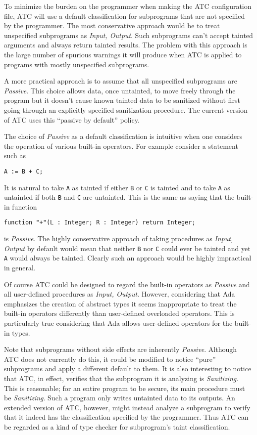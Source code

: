 \documentclass{article}
\begin{document}
To minimize the burden on the programmer when making the ATC configuration file, ATC will use a default classification for subprograms that are not specified by the programmer. The most conservative approach would be to treat unspecified subprograms as \textit{Input, Output}. Such subprograms can't accept tainted arguments and always return tainted results. The problem with this approach is the large number of spurious warnings it will produce when ATC is applied to programs with mostly unspecified subprograms.

A more practical approach is to assume that all unspecified subprograms are \textit{Passive}. This choice allows data, once untainted, to move freely through the program but it doesn't cause known tainted data to be sanitized without first going through an explicitly specified sanitization procedure. The current version of ATC uses this ``passive by default'' policy.

The choice of \textit{Passive} as a default classification is intuitive when one considers the operation of various built-in operators. For example consider a statement such as

\begin{verbatim}
A := B + C;
\end{verbatim}

It is natural to take \texttt{A} as tainted if either \texttt{B} or \texttt{C} is tainted and to take \texttt{A} as untainted if both \texttt{B} and \texttt{C} are untainted. This is the same as saying that the built-in function

\vspace{1.0ex}
\centerline{\texttt{function "+"(L : Integer; R : Integer) return Integer;}}

is \textit{Passive}. The highly conservative approach of taking procedures as \textit{Input, Output} by default would mean that neither \texttt{B} nor \texttt{C} could ever be tainted and yet \texttt{A} would always be tainted. Clearly such an approach would be highly impractical in general.

Of course ATC could be designed to regard the built-in operators as \textit{Passive} and all user-defined procedures as \textit{Input, Output}. However, considering that Ada emphasizes the creation of abstract types it seems inappropriate to treat the built-in operators differently than user-defined overloaded operators. This is particularly true considering that Ada allows user-defined operators for the built-in types.

Note that subprograms without side effects are inherently \textit{Passive}. Although ATC does not currently do this, it could be modified to notice ``pure'' subprograms and apply a different default to them. It is also interesting to notice that ATC, in effect, verifies that the subprogram it is analyzing is \textit{Sanitizing}. This is reasonable; for an entire program to be secure, its main procedure must be \textit{Sanitizing}. Such a program only writes untainted data to its outputs. An extended version of ATC, however, might instead analyze a subprogram to verify that it indeed has the classification specified by the programmer. Thus ATC can be regarded as a kind of type checker for subprogram's taint classification.
\end{document}
